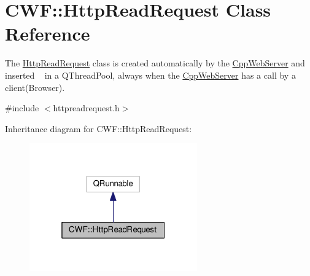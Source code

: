 \hypertarget{class_c_w_f_1_1_http_read_request}{\section{C\+W\+F\+:\+:Http\+Read\+Request Class Reference}
\label{class_c_w_f_1_1_http_read_request}
}


The \hyperlink{class_c_w_f_1_1_http_read_request}{Http\+Read\+Request} class is created automatically by the \hyperlink{class_c_w_f_1_1_cpp_web_server}{Cpp\+Web\+Server} and inserted ~\newline
 in a Q\+Thread\+Pool, always when the \hyperlink{class_c_w_f_1_1_cpp_web_server}{Cpp\+Web\+Server} has a call by a client(\+Browser).  




{\ttfamily \#include $<$httpreadrequest.\+h$>$}



Inheritance diagram for C\+W\+F\+:\+:Http\+Read\+Request\+:\nopagebreak
\begin{figure}[H]
\begin{center}
\leavevmode
\includegraphics[width=205pt]{class_c_w_f_1_1_http_read_request__inherit__graph}
\end{center}
\end{figure}
